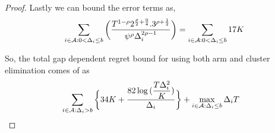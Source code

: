 \begin{proof}
	Lastly we can bound the error terms as, 
	\begin{align*}
	\sum\limits_{i\in \mathcal{A} :0 < \Delta_{i}\leq b}\bigg(\dfrac{T^{1-\rho}2^{\frac{\rho}{2}+\frac{9}{4}}.3^{\rho +\frac{1}{2}}}{\psi^{\rho }\Delta_{i}^{2\rho -1}} \bigg)= \sum\limits_{i\in \mathcal{A} :0 < \Delta_{i}\leq b} 17 K
	\end{align*}

	So, the total gap dependent regret bound for using both arm and cluster elimination comes of as
	\begin{align*}
	& \sum_{i\in \mathcal{A} :\Delta_{i} > b}\bigg\lbrace 34 K + \dfrac{82\log{(\dfrac{T\Delta_{i}^{2}}{ K})}}{\Delta_{i}}\bigg\rbrace 
 + \max\limits_{i\in \mathcal{A} :\Delta_{i}\leq b}\Delta_{i}T 
	\end{align*}
\end{proof}




